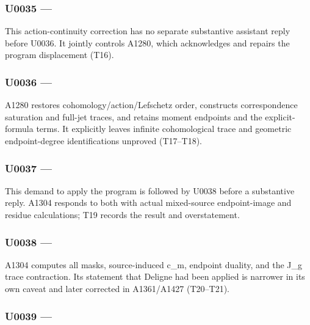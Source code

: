 \subsubsection{\texorpdfstring{U0035 ---
\protect{}}{U0035 --- }}\label{TranscriptLedgerStage:u0035-7b9f7612-3a57-4687-9bfb-39d1d933baf8}

This action-continuity correction has no separate substantive assistant
reply before U0036. It jointly controls A1280, which acknowledges and
repairs the program displacement (T16).

\subsubsection{\texorpdfstring{U0036 ---
\protect{}}{U0036 --- }}\label{TranscriptLedgerStage:u0036-d6542f7d-b917-4de5-b35d-07062f16e9c1}

A1280 restores cohomology/action/Lefschetz order, constructs
correspondence saturation and full-jet traces, and retains moment
endpoints and the explicit-formula terms. It explicitly leaves infinite
cohomological trace and geometric endpoint-degree identifications
unproved (T17--T18).

\subsubsection{\texorpdfstring{U0037 ---
\protect{}}{U0037 --- }}\label{TranscriptLedgerStage:u0037-8b2110e7-195b-42d0-8c86-7277004e35fd}

This demand to apply the program is followed by U0038 before a
substantive reply. A1304 responds to both with actual mixed-source
endpoint-image and residue calculations; T19 records the result and
overstatement.

\subsubsection{\texorpdfstring{U0038 ---
\protect{}}{U0038 --- }}\label{TranscriptLedgerStage:u0038-4ab2ff8f-915a-417d-876f-7294ed662b24}

A1304 computes all masks, source-induced c\_m, endpoint duality, and the
J\_g trace contraction. Its statement that Deligne had been applied is
narrower in its own caveat and later corrected in A1361/A1427
(T20--T21).

\subsubsection{\texorpdfstring{U0039 ---
\protect{}}{U0039 --- }}\label{TranscriptLedgerStage:u0039-71c1d5ee-668e-4eea-ac21-d844702248ea}

